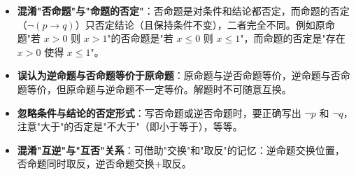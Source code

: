 \begin{trapbox}
\begin{itemize}
    \item \textbf{混淆"否命题"与"命题的否定"}：否命题是对条件和结论都否定，而命题的否定（\(\lnot(p\to q)\)）只否定结论（且保持条件不变），二者完全不同。例如原命题"若 \(x>0\) 则 \(x>1\)"的否命题是"若 \(x\le0\) 则 \(x\le1\)"，而命题的否定是"存在 \(x>0\) 使得 \(x\le1\)"。
    \item \textbf{误认为逆命题与否命题等价于原命题}：原命题与逆否命题等价，逆命题与否命题等价，但原命题与逆命题不一定等价。解题时不可随意互换。
    \item \textbf{忽略条件与结论的否定形式}：写否命题或逆否命题时，要正确写出 \(\lnot p\) 和 \(\lnot q\)，注意"大于"的否定是"不大于"（即小于等于），等等。
    \item \textbf{混淆"互逆"与"互否"关系}：可借助"交换"和"取反"的记忆：逆命题交换位置，否命题同时取反，逆否命题交换+取反。
\end{itemize}
\end{trapbox}